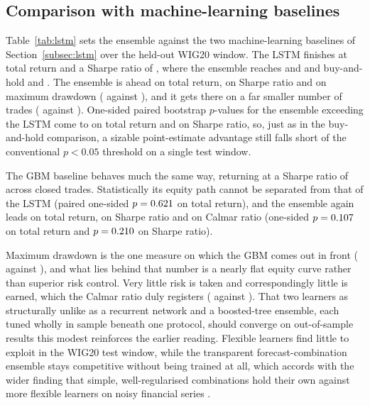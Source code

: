 \subsection{Comparison with machine-learning baselines}\label{subsec:lstm_results}

Table~\ref{tab:lstm} sets the ensemble against the two machine-learning baselines of Section~\ref{subsec:lstm} over the held-out WIG20 window. The LSTM finishes at \LSTMtest{} total return and a Sharpe ratio of \LSTMsharpe{}, where the ensemble reaches \TRtest{} and \Shtest{} and buy-and-hold \BHtest{} and \BHsharpe{}. The ensemble is ahead on total return, on Sharpe ratio and on maximum drawdown (\MDDtest{} against \LSTMmdd{}), and it gets there on a far smaller number of trades (\Ntrades{} against \LSTMtrades{}). One-sided paired bootstrap $p$-values for the ensemble exceeding the LSTM come to \PensVsLSTM{} on total return and \PensVsLSTMsharpe{} on Sharpe ratio, so, just as in the buy-and-hold comparison, a sizable point-estimate advantage still falls short of the conventional $p < 0.05$ threshold on a single test window.

The GBM baseline behaves much the same way, returning \GBMtest{} at a Sharpe ratio of \GBMsharpe{} across \GBMtrades{} closed trades. Statistically its equity path cannot be separated from that of the LSTM (paired one-sided $p = 0.621{}$ on total return), and the ensemble again leads on total return, on Sharpe ratio and on Calmar ratio (one-sided $p = 0.107{}$ on total return and $p = 0.210{}$ on Sharpe ratio).

Maximum drawdown is the one measure on which the GBM comes out in front (\GBMmdd{} against \MDDtest{}), and what lies behind that number is a nearly flat equity curve rather than superior risk control. Very little risk is taken and correspondingly little is earned, which the Calmar ratio duly registers (\GBMcalmar{} against \Calmtest{}). That two learners as structurally unlike as a recurrent network and a boosted-tree ensemble, each tuned wholly in sample beneath one protocol, should converge on out-of-sample results this modest reinforces the earlier reading. Flexible learners find little to exploit in the WIG20 test window, while the transparent forecast-combination ensemble stays competitive without being trained at all, which accords with the wider finding that simple, well-regularised combinations hold their own against more flexible learners on noisy financial series \cite{clemen1989,timmermann2006}.

